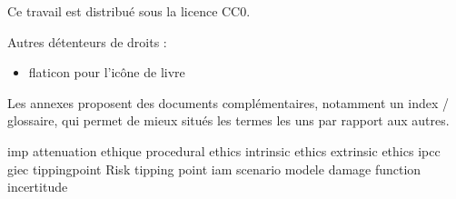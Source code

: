 \begin{tcolorbox}[title=License]
    Ce travail est distribué sous la licence CC0. 

    Autres détenteurs de droits : 
    \begin{itemize}
        \item flaticon pour l'icône de livre
    \end{itemize}
\end{tcolorbox}


Les annexes proposent des documents complémentaires, notamment un index / glossaire, qui permet de mieux situés les termes les uns par rapport aux autres. 



\begin{tcolorbox}[title=Accronymes]
    \Gls{imp} \Gls{attenuation} \Gls{ethique} \Gls{procedural ethics} \Gls{intrinsic ethics} \Gls{extrinsic ethics} \Gls{ipcc} \Gls{giec} \Gls{tippingpoint} \Gls{Risk tipping point} \Gls{iam} \Gls{scenario} \Gls{modele} \Gls{damage function} \Gls{incertitude}
\end{tcolorbox}
